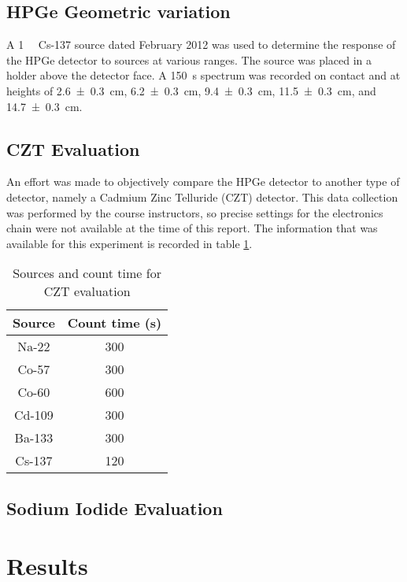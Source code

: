 \documentclass[12pt]{article}
\begin{document}
\subsection{HPGe Geometric variation}
A \SI{1}{\micro\curie} Cs-137 source dated February 2012 was used to determine the response of the HPGe detector to sources at various ranges. The source was placed in a holder above the detector face. A \SI{150}{\second} spectrum was recorded on contact and at heights of \SI{2.6\pm.3}{\centi\meter}, \SI{6.2\pm.3}{\centi\meter}, \SI{9.4\pm.3}{\centi\meter}, \SI{11.5\pm.3}{\centi\meter}, and \SI{14.7\pm.3}{\centi\meter}.

\subsection{CZT Evaluation}
An effort was made to objectively compare the HPGe detector to another type of detector, namely a Cadmium Zinc Telluride (CZT) detector. This data collection was performed by the course instructors, so precise settings for the electronics chain were not available at the time of this report. The information that was available for this experiment is recorded in table \ref{tab:cztsources}.

\begin{center}
\begin{table}
	\centering
	\caption{Sources and count time for CZT evaluation\label{tab:cztsources}}
	\begin{tabular}{c c}
		\hline\hline
		Source & Count time (\si{\second}) \\
		\hline
		Na-22 & 300 \\
		Co-57 & 300 \\
		Co-60 & 600 \\ 
		Cd-109 & 300 \\
		Ba-133 & 300 \\
		Cs-137 & 120 \\
		\hline
	\end{tabular}
\end{table}
\end{center}

\subsection{Sodium Iodide Evaluation}


\section{Results}
\end{document}
